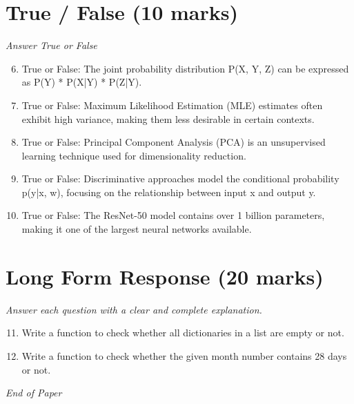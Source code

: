 \documentclass[12pt]{article}
\begin{document}
\section*{True / False (10 marks)}
\textit{Answer True or False}
\begin{enumerate}[label=\arabic*.]
\setcounter{enumi}{5}
\item True or False: The joint probability distribution P(X, Y, Z) can be expressed as P(Y) * P(X|Y) * P(Z|Y).
\item True or False: Maximum Likelihood Estimation (MLE) estimates often exhibit high variance, making them less desirable in certain contexts.
\item True or False: Principal Component Analysis (PCA) is an unsupervised learning technique used for dimensionality reduction.
\item True or False: Discriminative approaches model the conditional probability p(y|x, w), focusing on the relationship between input x and output y.
\item True or False: The ResNet-50 model contains over 1 billion parameters, making it one of the largest neural networks available.
\end{enumerate}

\section*{Long Form Response (20 marks)}
\textit{Answer each question with a clear and complete explanation.}
\begin{enumerate}[label=\arabic*.]
\setcounter{enumi}{10}
\item Write a function to check whether all dictionaries in a list are empty or not.
\item Write a function to check whether the given month number contains 28 days or not.
\end{enumerate}

\vfill
\noindent\textit{End of Paper}
\end{document}
